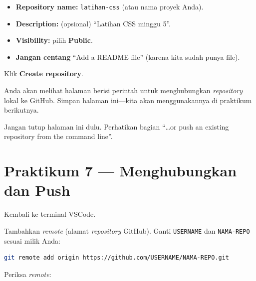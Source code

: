 \begin{itemize}
  \item \textbf{Repository name:} \texttt{latihan-css} (atau nama proyek Anda).
  \item \textbf{Description:} (opsional) ``Latihan CSS minggu 5''.
  \item \textbf{Visibility:} pilih \textbf{Public}.
  \item \textbf{Jangan centang} ``Add a README file'' (karena kita sudah punya file).
\end{itemize}

\begin{langkah}
  \item Klik \textbf{Create repository}.
  \item Anda akan melihat halaman berisi perintah untuk menghubungkan \emph{repository} lokal ke GitHub. Simpan halaman ini---kita akan menggunakannya di praktikum berikutnya.
\end{langkah}

\begin{catatan}
Jangan tutup halaman ini dulu. Perhatikan bagian ``\ldots or push an existing repository from the command line''.
\end{catatan}

\section{Praktikum 7 --- Menghubungkan dan Push}
\label{sec:git-praktik-7}

\begin{langkah}
  \item Kembali ke terminal VSCode.
  \item Tambahkan \emph{remote} (alamat \emph{repository} GitHub). Ganti \texttt{USERNAME} dan \texttt{NAMA-REPO} sesuai milik Anda:
\end{langkah}

\begin{lstlisting}[language=bash, caption={Menambahkan remote origin}, label={lst:git-remote}]
git remote add origin https://github.com/USERNAME/NAMA-REPO.git
\end{lstlisting}

\begin{langkah}
  \item Periksa \emph{remote}:
\end{langkah}

